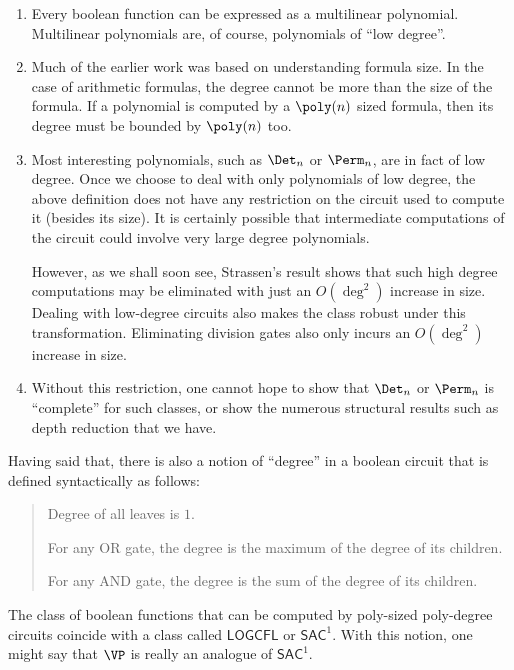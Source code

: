\begin{enumerate}

\item Every boolean function can be expressed as a multilinear polynomial.
Multilinear polynomials are, of course, polynomials of ``low degree''.

\item Much of the earlier work was based on understanding formula size.
In the case of arithmetic formulas, the degree cannot be more than the size of the formula.
If a polynomial is computed by a $\poly(n)$ sized formula, then its degree must be bounded by $\poly(n)$ too.

\item Most interesting polynomials, such as $\Det_n$ or $\Perm_n$, are in fact of low degree.
Once we choose to deal with only polynomials of low degree, the above definition does not have any restriction on the circuit used to compute it (besides its size).
It is certainly possible that intermediate computations of the circuit could involve very large degree polynomials.

However, as we shall soon see, Strassen's result shows that such high degree computations may be eliminated with just an $O(\deg^2)$ increase in size.
Dealing with low-degree circuits also makes the class robust under this transformation.
Eliminating division gates also only incurs an $O(\deg^2)$ increase in size.

\item Without this restriction, one cannot hope to show that $\Det_n$ or $\Perm_n$ is ``complete'' for such classes, or
show the numerous structural results such as depth reduction that we have.

\end{enumerate}

Having said that, there is also a notion of ``degree'' in a boolean circuit that is defined syntactically as follows:
 \begin{quote}
   Degree of all leaves is $1$.

   For any OR gate, the degree is the maximum of the degree of its children.

   For any AND gate, the degree is the sum of the degree of its children.
 \end{quote}
The class of boolean functions that can be computed by poly-sized poly-degree circuits coincide with a class called $\mathsf{LOGCFL}$ or $\mathsf{SAC}^1$.
With this notion, one might say that $\VP$ is really an analogue of $\mathsf{SAC}^1$.\\


